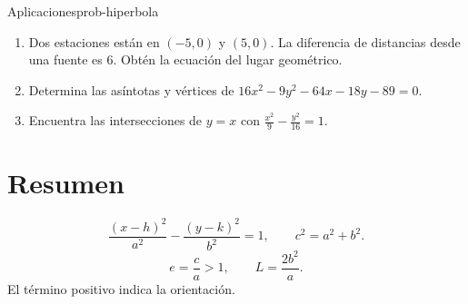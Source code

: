 \begin{problem}{Aplicaciones}{prob-hiperbola}
\begin{enumerate}
  \item Dos estaciones están en $(-5,0)$ y $(5,0)$. La diferencia de
  distancias desde una fuente es $6$. Obtén la ecuación del lugar geométrico.
  \item Determina las asíntotas y vértices de
  $16x^2-9y^2-64x-18y-89=0$.
  \item Encuentra las intersecciones de $y=x$ con $\frac{x^2}{9}-\frac{y^2}{16}=1$.
\end{enumerate}
\end{problem}

\section*{Resumen}
\begin{properties}
\[
\frac{(x-h)^2}{a^2}-\frac{(y-k)^2}{b^2}=1,
\qquad c^2=a^2+b^2.
\]
\[
e=\frac ca>1,
\qquad L=\frac{2b^2}{a}.
\]
El término positivo indica la orientación.
\end{properties}
